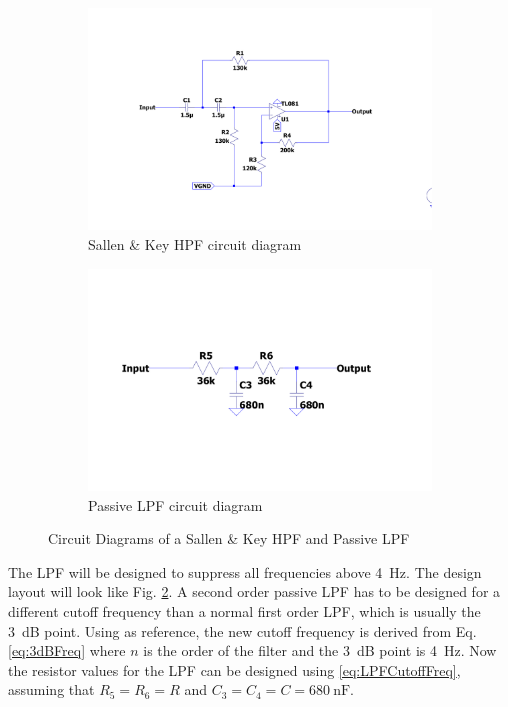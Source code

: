  
 \begin{figure}
    \centering
    \begin{subfigure}[]{0.55\textwidth}
        \includegraphics[width=\linewidth]{./Figures/HPFCircuit_cropped.pdf}
        \caption{Sallen \& Key HPF circuit diagram}
	    \label{subfig:Sallen}	
   \end{subfigure}
   \begin{subfigure}[]{0.35\textwidth}
        \includegraphics[width=\linewidth]{./Figures/LPFCircuit_cropped.pdf}
        \caption{Passive LPF circuit diagram}
	    \label{subfig:LPF}	
   \end{subfigure}
    \caption[Filters Circuit Diagrams]{Circuit Diagrams of a Sallen \& Key HPF and Passive LPF}
    \label{fig:CirDiagram}
\end{figure}
 
\par

The LPF will be designed to suppress all frequencies above \SI{4}{\hertz}. The design layout will look like Fig. \ref{subfig:LPF}. A second order passive LPF has to be designed for a different cutoff frequency than a normal first order LPF, which is usually the \SI{3}{\deci\bel} point. Using \cite{LPF} as reference, the new cutoff frequency is derived from Eq. \ref{eq:3dBFreq} where $n$ is the order of the filter and the \SI{3}{\deci\bel} point is \SI{4}{\hertz}. 
Now the resistor values for the LPF can be designed using \ref{eq:LPFCutoffFreq}, assuming that $R_{5}=R_{6}=R$ and $C_{3}=C_{4}=C=\SI{680}{\nano\farad}$. 

